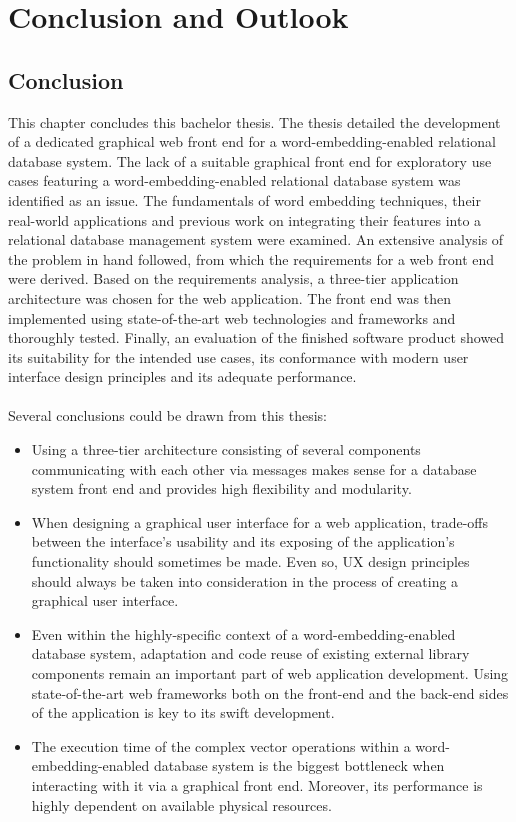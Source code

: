 
\chapter{Conclusion and Outlook}
\label{cha:conclusion}
\section{Conclusion}
This chapter concludes this bachelor thesis. The thesis detailed the development of a dedicated graphical web front end for a word-embedding-enabled relational database system. The lack of a suitable graphical front end for exploratory use cases featuring a word-embedding-enabled relational database system was identified as an issue. The fundamentals of word embedding techniques, their real-world applications and previous work on integrating their features into a relational database management system were examined. An extensive analysis of the problem in hand followed, from which the requirements for a web front end were derived. Based on the requirements analysis, a three-tier application architecture was chosen for the web application. The front end was then implemented using state-of-the-art web technologies and frameworks and thoroughly tested. Finally, an evaluation of the finished software product showed its suitability for the intended use cases, its conformance with modern user interface design principles and its adequate performance. \\ \\
Several conclusions could be drawn from this thesis:
\begin{itemize}
	\item Using a three-tier architecture consisting of several components communicating with each other via messages makes sense for a database system front end and provides high flexibility and modularity.
	\item When designing a graphical user interface for a web application, trade-offs between the interface's usability and its exposing of the application's functionality should sometimes be made. Even so, UX design principles should always be taken into consideration in the process of creating a graphical user interface.
	\item Even within the highly-specific context of a word-embedding-enabled database system, adaptation and code reuse of existing external library components remain an important part of web application development. Using state-of-the-art web frameworks both on the front-end and the back-end sides of the application is key to its swift development.
	\item The execution time of the complex vector operations within a word-embedding-enabled database system is the biggest bottleneck when interacting with it via a graphical front end. Moreover, its performance is highly dependent on available physical resources.
\end{itemize}

